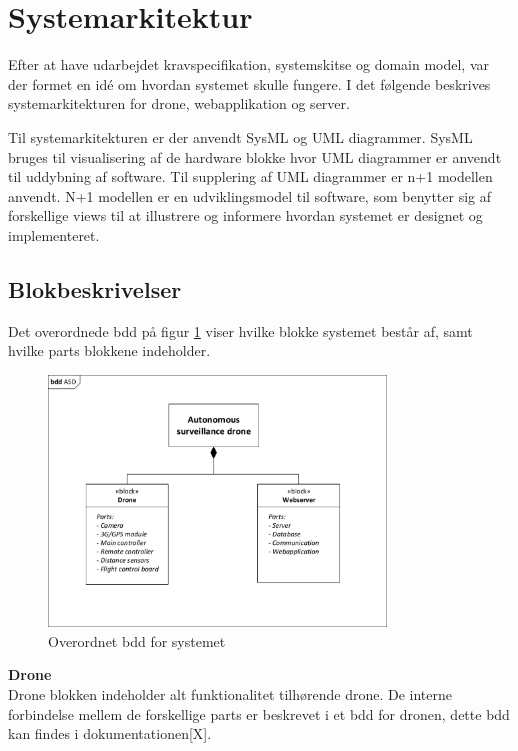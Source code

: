 \section{Systemarkitektur}
\label{chap:systemarkitektur}

Efter at have udarbejdet kravspecifikation, systemskitse og domain model, var der formet en idé om hvordan systemet skulle fungere. 
I det følgende beskrives systemarkitekturen for drone, webapplikation og server. 

Til systemarkitekturen er der anvendt SysML og UML diagrammer. SysML bruges til visualisering af de hardware blokke hvor UML diagrammer er anvendt til uddybning af software. Til supplering af UML diagrammer er n+1 modellen anvendt. N+1 modellen er en udviklingsmodel til software, som benytter sig af forskellige views til at illustrere og informere hvordan systemet er designet og implementeret.
 
\subsection{Blokbeskrivelser}
Det overordnede bdd på figur \ref{fig:bdd_asd} viser hvilke blokke systemet består af, samt hvilke parts blokkene indeholder.

\begin{figure}[H]
	\centering
	\includegraphics[width=0.80\textwidth]{Billeder/Projektbeskrivelse/bdd_overordnet.pdf}
	\caption{Overordnet bdd for systemet}
	\label{fig:bdd_asd}
\end{figure}

\textbf{Drone} \\
Drone blokken indeholder alt funktionalitet tilhørende drone. De interne forbindelse mellem de forskellige parts er beskrevet i et bdd for dronen, dette bdd kan findes i dokumentationen[X].

